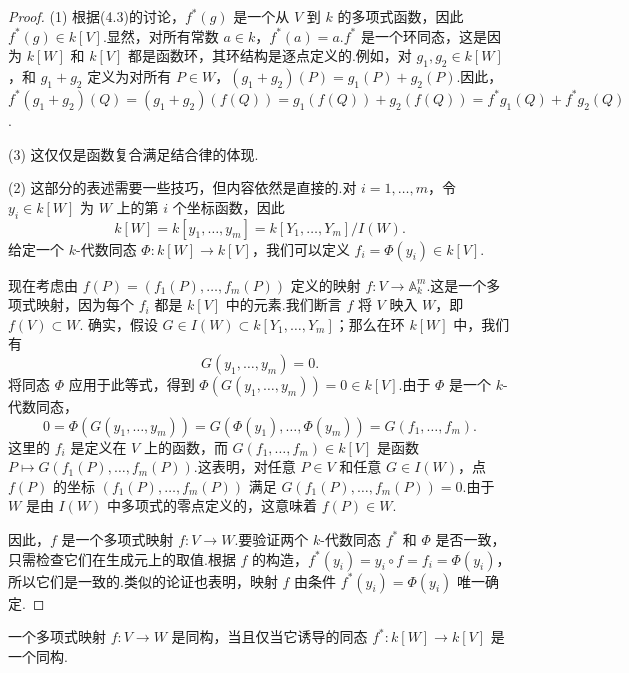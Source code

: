 \begin{proof}
(1) 根据(4.3)的讨论，\({f}^{ * }(g)\) 是一个从 \(V\) 到 \(k\) 的多项式函数，因此 \({f}^{ * }(g) \in  k[V]\).显然，对所有常数 \(a \in  k\)，\({f}^{ * }(a) = a\).\({f}^{ * }\) 是一个环同态，这是因为 \(k[W]\) 和 \(k[V]\) 都是函数环，其环结构是逐点定义的.例如，对 \({g}_{1},{g}_{2} \in  k[W]\)，和 \({g}_{1} + {g}_{2}\) 定义为对所有 \(P \in  W\)，\((g_1 + g_2)(P) = g_1(P) + g_2(P)\).因此，\({f}^{ * }(g_1 + g_2)(Q) = (g_1 + g_2)(f(Q)) = g_1(f(Q)) + g_2(f(Q)) = {f}^{ * }g_1(Q) + {f}^{ * }g_2(Q)\).

(3) 这仅仅是函数复合满足结合律的体现.

(2) 这部分的表述需要一些技巧，但内容依然是直接的.对 \(i = 1,\ldots ,m\)，令 \({y}_{i} \in  k[W]\) 为 \(W\) 上的第 \(i\) 个坐标函数，因此
\[
k[W] = k[y_1, \ldots, y_m] = k[Y_1, \ldots, Y_m]/I(W).
\]
给定一个 \(k\)-代数同态 \(\Phi  : k[W] \rightarrow  k[V]\)，我们可以定义 \({f}_{i} = \Phi(y_i) \in  k[V]\).

现在考虑由 \(f(P) = (f_1(P), \ldots, f_m(P))\) 定义的映射 \(f : V \rightarrow  {\mathbb{A}}_{k}^{m}\).这是一个多项式映射，因为每个 \({f}_{i}\) 都是 \(k[V]\) 中的元素.我们断言 \(f\) 将 \(V\) 映入 \(W\)，即 \(f(V) \subset  W\).
确实，假设 \(G \in  I(W) \subset  k[Y_1, \ldots, Y_m]\)；那么在环 \(k[W]\) 中，我们有
\[
G(y_1, \ldots, y_m) = 0.
\]
将同态 \(\Phi\) 应用于此等式，得到 \( \Phi(G(y_1, \ldots, y_m)) = 0 \in  k[V]\).由于 \(\Phi\) 是一个 \(k\)-代数同态，
\[
0 = \Phi(G(y_1, \ldots, y_m)) = G(\Phi(y_1), \ldots, \Phi(y_m)) = G(f_1, \ldots, f_m).
\]
这里的 \({f}_{i}\) 是定义在 \(V\) 上的函数，而 \(G(f_1, \ldots, f_m) \in  k[V]\) 是函数 \(P \mapsto  G(f_1(P), \ldots, f_m(P))\).这表明，对任意 \(P \in  V\) 和任意 \(G \in  I(W)\)，点 \(f(P)\) 的坐标 \((f_1(P), \ldots, f_m(P))\) 满足 \(G(f_1(P), \ldots, f_m(P)) = 0\).由于 \(W\) 是由 \(I(W)\) 中多项式的零点定义的，这意味着 \(f(P) \in  W\).

因此，\(f\) 是一个多项式映射 \(f : V \rightarrow  W\).要验证两个 \(k\)-代数同态 \({f}^{ * }\) 和 \(\Phi\) 是否一致，只需检查它们在生成元上的取值.根据 \(f\) 的构造，\({f}^{ * }(y_i) = y_i \circ f = f_i = \Phi(y_i)\)，所以它们是一致的.类似的论证也表明，映射 \(f\) 由条件 \({f}^{ * }(y_i) = \Phi(y_i)\) 唯一确定.
\end{proof}

\begin{corollary}
一个多项式映射 \(f : V \rightarrow  W\) 是同构，当且仅当它诱导的同态 \({f}^{ * } : k[W] \rightarrow  k[V]\) 是一个同构.
\end{corollary}

